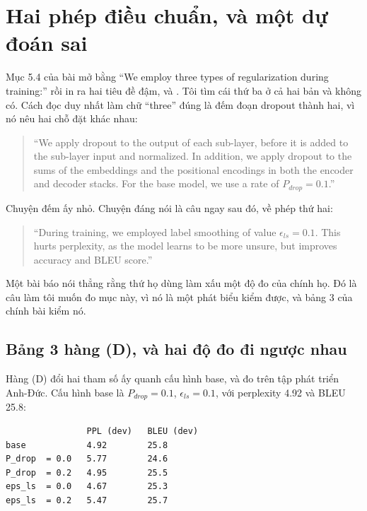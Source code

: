 \section{Hai phép điều chuẩn, và một dự đoán sai}
\label{sec:ch08-dieu-chuan}

%
Mục 5.4 của bài mở bằng \enquote{We employ three types of regularization during
training:} rồi in ra hai tiêu đề đậm,  và
. Tôi tìm cái thứ ba ở cả hai bản và không có. Cách đọc
duy nhất làm chữ \enquote{three} đúng là đếm đoạn dropout thành hai, vì nó nêu
hai chỗ đặt khác nhau:

\begin{quote}
\enquote{We apply dropout to the output of each sub-layer, before it is added
to the sub-layer input and normalized. In addition, we apply dropout to the sums
of the embeddings and the positional encodings in both the encoder and decoder
stacks. For the base model, we use a rate of \(P_{drop} = 0.1\).}
\end{quote}

Chuyện đếm ấy nhỏ. Chuyện đáng nói là câu ngay sau đó, về phép thứ hai:

\begin{quote}
\enquote{During training, we employed label smoothing of value
\(\epsilon_{ls} = 0.1\). This hurts perplexity, as the model learns to be more
unsure, but improves accuracy and BLEU score.}
\end{quote}

%
Một bài báo nói thẳng rằng thứ họ dùng làm xấu một độ đo của chính họ. Đó là câu
làm tôi muốn đo mục này, vì nó là một phát biểu kiểm được, và bảng 3 của chính
bài kiểm nó.

\subsection*{Bảng 3 hàng (D), và hai độ đo đi ngược nhau}

%
Hàng (D) đổi hai tham số ấy quanh cấu hình base, và đo trên tập phát triển
Anh-Đức. Cấu hình base là \(P_{drop} = 0.1\), \(\epsilon_{ls} = 0.1\), với
perplexity 4.92 và BLEU 25.8:

\begin{verbatim}
                PPL (dev)   BLEU (dev)
base            4.92        25.8
P_drop  = 0.0   5.77        24.6
P_drop  = 0.2   4.95        25.5
eps_ls  = 0.0   4.67        25.3
eps_ls  = 0.2   5.47        25.7
\end{verbatim}

